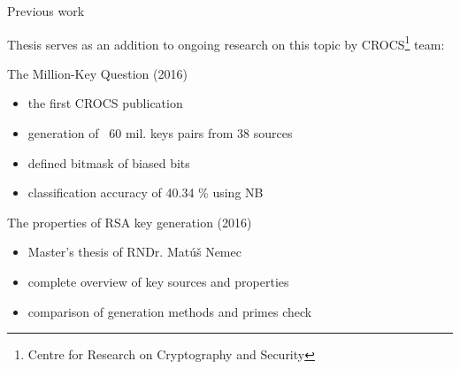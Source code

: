 \documentclass[
]{beamer}
\newcommand\Fontsmall{\fontsize{8}{7.2}\selectfont}
\begin{document}
\begin{frame}{Previous work}

\Fontsmall

Thesis serves as an addition to ongoing research on this topic by CROCS\footnote{Centre for Research on Cryptography and Security} team:



\begin{alertblock}{The Million-Key Question (2016)}
  \begin{itemize}
    \item the first CROCS publication
    \item generation of ~60 mil. keys pairs from 38 sources
    \item defined bitmask of biased bits
    \item classification accuracy of 40.34 \% using NB
  \end{itemize}
\end{alertblock}


\begin{alertblock}{The properties of RSA key generation (2016)}
  \begin{itemize}
    \item Master's thesis of RNDr. Matúš Nemec
    \item complete overview of key sources and properties
    \item comparison of generation methods and primes check
  \end{itemize}
\end{alertblock}
\end{frame}
\end{document}
